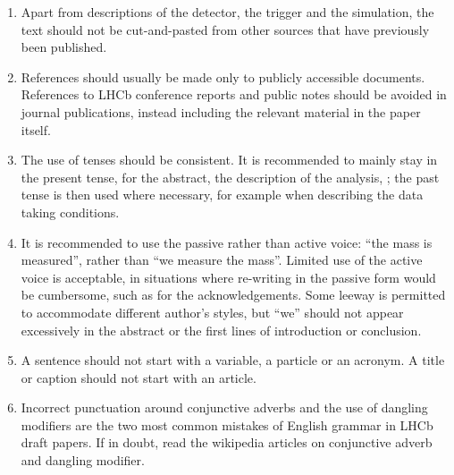 \begin{enumerate}
\item Apart from descriptions of the detector, the trigger and the
  simulation, the text should not be cut-and-pasted from other sources
  that have previously been published.

\item References should usually be made only to publicly accessible
  documents. References to LHCb conference reports and public notes
  should be avoided in journal publications, instead including the
  relevant material in the paper itself.

\item The use of tenses should be consistent. It is recommended to
  mainly stay in the present tense, for the abstract, the description
  of the analysis, \etc; the past tense is then used where necessary,
  for example when describing the data taking conditions.

\item It is recommended to use the passive rather than active voice:
  ``the mass is measured'', rather than ``we measure the mass''.
  Limited use of the active voice is acceptable, in situations where
  re-writing in the passive form would be cumbersome, such as for the
  acknowledgements.  Some leeway is permitted to accommodate different
  author's styles, but ``we'' should not appear excessively in the
  abstract or the first lines of introduction or conclusion.

\item A sentence should not start with a variable, a particle or an acronym. A title or caption should not start with an article. 

\item Incorrect punctuation around conjunctive adverbs and the use of 
dangling modifiers are the two most common mistakes of English grammar
in LHCb draft papers. If in doubt, read the wikipedia articles on 
conjunctive adverb and dangling modifier.  

\end{enumerate}
